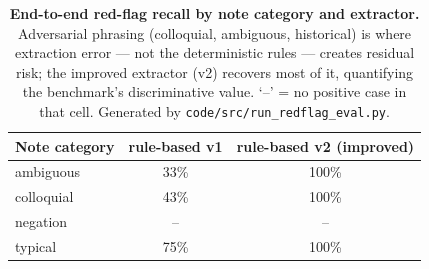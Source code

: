 \begin{table}[htbp]
\centering
\caption{\textbf{End-to-end red-flag recall by note category and extractor.} Adversarial phrasing (colloquial, ambiguous, historical) is where extraction error --- not the deterministic rules --- creates residual risk; the improved extractor (v2) recovers most of it, quantifying the benchmark's discriminative value. `--' = no positive case in that cell. Generated by \texttt{code/src/run\_redflag\_eval.py}.}
\label{tab:redflag_bycat}
\small
\begin{tabular}{lcc}
\toprule
Note category & rule-based v1 & rule-based v2 (improved) \\
\midrule
ambiguous & 33\% & 100\% \\
colloquial & 43\% & 100\% \\
negation & -- & -- \\
typical & 75\% & 100\% \\
\bottomrule
\end{tabular}
\end{table}
